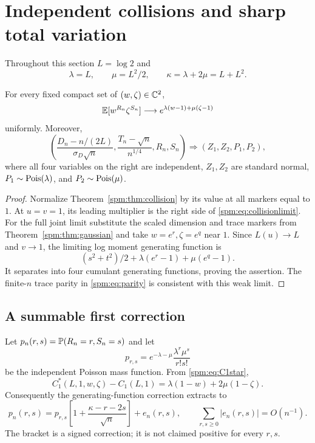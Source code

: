 \section{Independent collisions and sharp total variation}\label{spm:sec:TV}
Throughout this section $L=\log2$ and
\[
 \lambda=L,\qquad \mu=L^2/2,\qquad \kappa=\lambda+2\mu=L+L^2.
\]

\begin{theorem}\label{spm:thm:joint}
For every fixed compact set of $(w,\zeta)\in\mathbb C^2$,
\begin{equation}\label{spm:eq:collisionlimit}
 \mathbb E[w^{R_n}\zeta^{S_n}]
 \longrightarrow e^{\lambda(w-1)+\mu(\zeta-1)}
\end{equation}
uniformly. Moreover,
\begin{equation}\label{spm:eq:fourjoint}
 \left(\frac{D_n-n/(2L)}{\sigma_D\sqrt n},
       \frac{T_n-\sqrt n}{n^{1/4}},R_n,S_n\right)
 \Longrightarrow (Z_1,Z_2,P_1,P_2),
\end{equation}
where all four variables on the right are independent, $Z_1,Z_2$ are standard normal, $P_1\sim\operatorname{Pois}(\lambda)$, and $P_2\sim\operatorname{Pois}(\mu)$.
\end{theorem}
\begin{proof}
Normalize Theorem~\ref{spm:thm:collision} by its value at all markers equal to $1$. At $u=v=1$, its leading multiplier is the right side of \eqref{spm:eq:collisionlimit}. For the full joint limit substitute the scaled dimension and trace markers from Theorem~\ref{spm:thm:gaussian} and take $w=e^r,\zeta=e^q$ near $1$. Since $L(u)\to L$ and $v\to1$, the limiting log moment generating function is
\[
 (s^2+t^2)/2+\lambda(e^r-1)+\mu(e^q-1).
\]
It separates into four cumulant generating functions, proving the assertion. The finite-$n$ trace parity in \eqref{spm:eq:parity} is consistent with this weak limit.
\end{proof}

\subsection{A summable first correction}
Let $p_n(r,s)=\mathbb P(R_n=r,S_n=s)$ and let
\[
 p_{r,s}=e^{-\lambda-\mu}\frac{\lambda^r\mu^s}{r!s!}
\]
be the independent Poisson mass function. From \eqref{spm:eq:C1star},
\[
 C_1^*(L,1,w,\zeta)-C_1(L,1)
 =\lambda(1-w)+2\mu(1-\zeta).
\]
Consequently the generating-function correction extracts to
\begin{equation}\label{spm:eq:masscorrection}
 p_n(r,s)=p_{r,s}\left[1+\frac{\kappa-r-2s}{\sqrt n}\right]+e_n(r,s),
 \qquad \sum_{r,s\geq0}|e_n(r,s)|=O(n^{-1}).
\end{equation}
The bracket is a signed correction; it is not claimed positive for every $r,s$.

